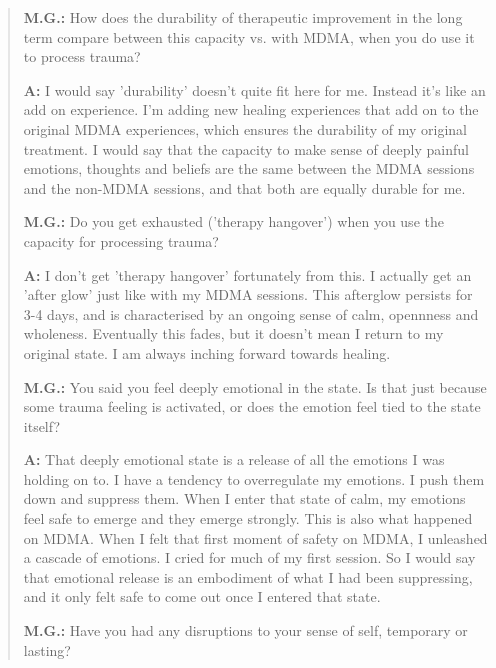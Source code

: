 \documentclass[12pt,letterpaper]{book}
\begin{document}
\begin{quotation}
    \vspace{\baselineskip}

    \textbf{M.G.:} How does the durability of therapeutic improvement in the long term compare between this capacity vs. with MDMA, when you do use it to process trauma?

    \textbf{A:} I would say 'durability' doesn't quite fit here for me. Instead it's like an add on experience. I'm adding new healing experiences that add on to the original MDMA experiences, which ensures the durability of my original treatment. I would say that the capacity to make sense of deeply painful emotions, thoughts and beliefs are the same between the MDMA sessions and the non-MDMA sessions, and that both are equally durable for me.

    \vspace{\baselineskip}

    \textbf{M.G.:} Do you get exhausted ('therapy hangover') when you use the capacity for processing trauma?

    \textbf{A:} I don't get 'therapy hangover' fortunately from this. I actually get an 'after glow' just like with my MDMA sessions. This afterglow persists for 3-4 days, and is characterised by an ongoing sense of calm, opennness and wholeness. Eventually this fades, but it doesn't mean I return to my original state. I am always inching forward towards healing.

    \vspace{\baselineskip}

    \textbf{M.G.:} You said you feel deeply emotional in the state. Is that just because some trauma feeling is activated, or does the emotion feel tied to the state itself?

    \textbf{A:} That deeply emotional state is a release of all the emotions I was holding on to. I have a tendency to overregulate my emotions. I push them down and suppress them. When I enter that state of calm, my emotions feel safe to emerge and they emerge strongly. This is also what happened on MDMA. When I felt that first moment of safety on MDMA, I unleashed a cascade of emotions. I cried for much of my first session. So I would say that emotional release is an embodiment of what I had been suppressing, and it only felt safe to come out once I entered that state.

    \vspace{\baselineskip}

    \textbf{M.G.:} Have you had any disruptions to your sense of self, temporary or lasting?


\end{quotation}
\end{document}
